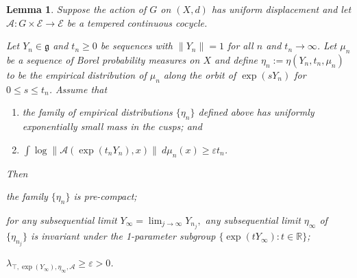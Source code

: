 \documentclass[10pt,reqno]{amsart}
\theoremstyle{Theorem}
\newtheorem{lemma}[theorem]{Lemma}
\theoremstyle{definition}
\theoremstyle{remark}
\newcommand{\note}[1]{\marginpar{{\color{red}\footnotesize \begin{spacing}{1}#1\end{spacing}}}}
\renewcommand{\epsilon}{\varepsilon}
\newcommand{\R}{\mathbb {R}}
\newcommand{\Z}{\mathbb {Z}}
\newcommand{\Sl}{\mathrm{SL}}
\def\calA{\mathcal A}
\def\calE{\mathcal E}
\newcommand{\lieg}{\mathfrak g}
\begin{document}
\begin{lemma} %
\label{lemma:firstexponents}
Suppose the action of $G$ on $(X,d)$ has uniform displacement and let $\calA\colon G\times \calE\to \calE$ be a tempered continuous cocycle.


Let $Y_n\in \lieg$ and  $t_n\ge 0$ be  sequences with  $\|Y_n\|=1$ for all $n$ and $t_n\to \infty$. Let $\mu_n$ be a sequence of Borel probability measures on $X$ and define $\eta_n :=  \eta(Y_n,t_n,\mu_n)$ to be the empirical distribution of $\mu_n$ along the orbit of $\exp (sY_n)$ for $0\le s\le t_n$.
 Assume that
\begin{enumerate}%
\item the family of empirical distributions  $\{\eta_n\} $ defined above has uniformly exponentially small mass in the cusps; and
\item $\int \log  \|\calA ( \exp (t_nY_n),x) \|  \ d \mu_n(x) \geq \epsilon t_n$.
\end{enumerate}
Then
\begin{enumlemma}
\item \label{lazylemmaa} the family $\{\eta_n\} $ is pre-compact;
\item \label{lazylemmab}for any subsequential limit $Y_\infty = \lim_{j\to \infty}  Y_{n_j},$  any subsequential limit $\eta_\infty $ of  $\{ \eta_{n_j}\}$ is invariant under the 1-parameter subgroup $\{ \exp (tY_\infty): t\in \R\}$;
\item \label{lazylemmac}$\lambda_{\top,  \exp (Y_\infty), \eta_\infty,\calA}\ge\epsilon>0$.
\end{enumlemma}
\end{lemma}
\end{document}
